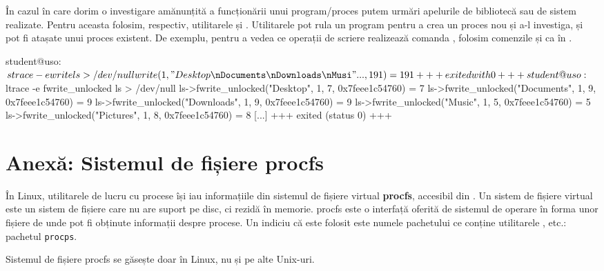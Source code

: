 În cazul în care dorim o investigare amănunțită a funcționării unui
program/proces putem urmări apelurile de bibliotecă sau de sistem realizate.
Pentru aceasta folosim, respectiv, utilitarele  și . Utilitarele pot
rula un program pentru a crea un proces nou și a-l investiga, și pot fi atașate
unui proces existent. De exemplu, pentru a vedea ce operații de scriere realizează comanda , folosim comenzile  și  ca în .

\begin{screen}[caption={Investigarea apelurilor de sistem și de blbliotecă},label={lst:process:trace}]
student@uso:~$ strace -e write ls > /dev/null
write(1, "Desktop\nDocuments\nDownloads\nMusi"..., 191) = 191
+++ exited with 0 +++
student@uso:~$ ltrace -e fwrite_unlocked ls > /dev/null
ls->fwrite_unlocked("Desktop", 1, 7, 0x7feee1c54760)                                                          = 7
ls->fwrite_unlocked("Documents", 1, 9, 0x7feee1c54760)                                                        = 9
ls->fwrite_unlocked("Downloads", 1, 9, 0x7feee1c54760)                                                        = 9
ls->fwrite_unlocked("Music", 1, 5, 0x7feee1c54760)                                                            = 5
ls->fwrite_unlocked("Pictures", 1, 8, 0x7feee1c54760)                                                         = 8
[...]
+++ exited (status 0) +++
\end{screen}

\section{Anexă: Sistemul de fișiere procfs}
\label{sec:process:proc}

În Linux, utilitarele de lucru cu procese își iau informațiile din sistemul de
fișiere virtual \textbf{procfs}, accesibil din . Un sistem de fișiere virtual este
un sistem de fișiere care nu are suport pe disc, ci rezidă în memorie. procfs
este o interfață oferită de sistemul de operare în forma unor fișiere de unde
pot fi obținute informații despre procese. Un indiciu că este folosit este
numele pachetului ce conține utilitarele ,  etc.: pachetul \texttt{procps}.

\begin{note}
Sistemul de fișiere procfs se găsește doar în Linux, nu și pe alte Unix-uri.
\end{note}

